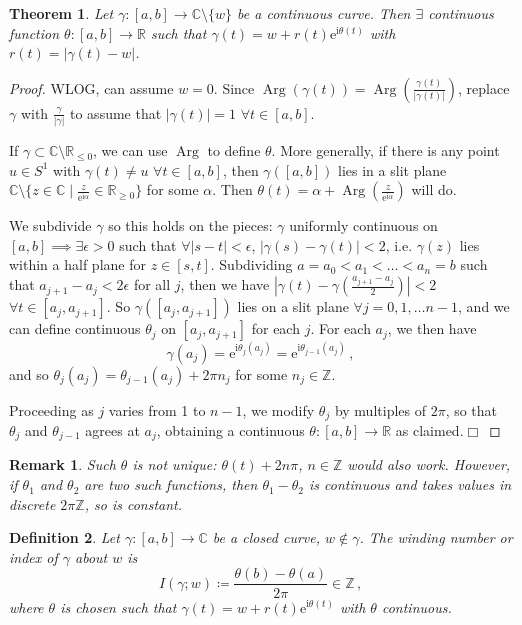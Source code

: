 \documentclass{article}
\theoremstyle{plain}\theoremheaderfont{\normalfont\itshape}\theorembodyfont{\rmfamily}\theoremseparator{.}\newtheorem*{rem}{Remark}\newtheorem*{ex}{Example}\newtheorem*{proof}{Proof}\newtheorem*{altp}{Alternative proof}\newtheorem*{con}{Consequences}\newtheorem*{notn}{Notations}\newtheorem*{cau}{Caution}\newtheorem*{term}{Terminology}\newtheorem*{keyex}{Key example}
\theoremstyle{plain}\theoremheaderfont{\normalfont\bfseries}\theorembodyfont{\rmfamily}\theoremseparator{.}\newtheorem{thm}{Theorem}[section]\newtheorem{lem}[thm]{Lemma}\newtheorem{prop}[thm]{Proposition}\newtheorem*{cor}{Corollary}\newtheorem{defn}[thm]{Definition}\newtheorem{clm}[thm]{Claim}\newtheorem{clminproof}{Claim}\newtheorem{leminproof}{Lemma}\newtheorem{app}{Application}
\theoremstyle{break}\theoremheaderfont{\normalfont\itshape}\theorembodyfont{\rmfamily}\theoremseparator{.\medskip}\newtheorem*{proofskip}{Proof}\newtheorem*{exs}{Examples}\newtheorem*{rems}{Remarks}\newtheorem*{rec}{Recall}\newtheorem*{ppts}{Properties}
\theoremstyle{break}\theoremheaderfont{\normalfont\bfseries}\theorembodyfont{\rmfamily}\theoremseparator{.\medskip}\newtheorem{lemskip}[thm]{Lemma}\newtheorem{defnskip}[thm]{Definition}\newtheorem{propskip}[thm]{Proposition}\newtheorem{thmskip}[thm]{Theorem}
\numberwithin{equation}{section}
\newcommand{\ii}{\mathrm{i}}
\newcommand{\ee}{\mathrm{e}}
\DeclareMathOperator*{\Arg}{Arg}
\newcommand{\qed}{\hfill\ensuremath{\Box}}
\newcommand{\abs}[1]{\left|#1\right|}
\newcommand{\ZZ}{\mathbb{Z}}
\newcommand{\RR}{\mathbb{R}}
\newcommand{\CC}{\mathbb{C}}
\begin{document}
    \begin{thm}
        Let \(\gamma:[a,b]\to\CC\setminus\{w\}\) be a continuous curve. Then \(\exists\) continuous function \(\theta:[a,b]\to\RR\) such that \(\gamma(t)=w+r(t)\ee^{\ii \theta(t)}\) with \(r(t)=\abs{\gamma(t)-w}\).
    \end{thm}
    \begin{proof}
        WLOG, can assume \(w=0\). Since \(\Arg(\gamma(t))=\Arg(\frac{\gamma(t)}{\abs{\gamma(t)}})\), replace \(\gamma\) with \(\frac{\gamma}{\abs{\gamma}}\) to assume that \(\abs{\gamma(t)}=1\) \(\forall t\in[a,b]\).

        If \(\gamma\subset\CC\setminus\RR_{\le 0}\), we can use \(\Arg\) to define \(\theta\). More generally, if there is any point \(u\in S^1\) with \(\gamma(t)\ne u\) \(\forall t\in[a,b]\), then \(\gamma([a,b])\) lies in a slit plane \(\CC\setminus\{z\in\CC\mid\frac{z}{\ee^{\ii \alpha}}\in\RR_{\ge 0}\}\) for some \(\alpha\). Then \(\theta(t)=\alpha+\Arg(\frac{z}{\ee^{\ii \alpha}})\) will do.

        We subdivide \(\gamma\) so this holds on the pieces: \(\gamma\) uniformly continuous on \([a,b]\implies\exists\epsilon>0\) such that \(\forall\abs{s-t}<\epsilon\), \(\abs{\gamma(s)-\gamma(t)}<2\), i.e. \(\gamma(z)\) lies within a half plane for \(z\in[s,t]\). Subdividing \(a=a_0<a_1<\dots<a_n=b\) such that \(a_{j+1}-a_j<2\epsilon\) for all \(j\), then we have \(\abs{\gamma(t)-\gamma(\frac{a_{j+1}-a_j}{2})}<2\) \(\forall t\in[a_j,a_{j+1}]\). So \(\gamma([a_j,a_{j+1}])\) lies on a slit plane \(\forall j=0,1,\dots n-1\), and we can define continuous \(\theta_j\) on \([a_j,a_{j+1}]\) for each \(j\). For each \(a_j\), we then have
        \[\gamma(a_j)=\ee^{\ii \theta_j(a_j)}=\ee^{\ii \theta_{j-1}(a_j)}\,,\]
        and so \(\theta_j(a_j)=\theta_{j-1}(a_j)+2\pi n_j\) for some \(n_j\in\ZZ\).

        Proceeding as \(j\) varies from 1 to \(n-1\), we modify \(\theta_j\) by multiples of \(2\pi\), so that \(\theta_j\) and \(\theta_{j-1}\) agrees at \(a_j\), obtaining a continuous \(\theta:[a,b]\to\RR\) as claimed.\qed
    \end{proof}
    \begin{rem}
        Such \(\theta\) is not unique: \(\theta(t)+2n\pi\), \(n\in\ZZ\) would also work. However, if \(\theta_1\) and \(\theta_2\) are two such functions, then \(\theta_1-\theta_2\) is continuous and takes values in discrete \(2\pi\ZZ\), so is constant.
    \end{rem}
    \begin{defn}
        Let \(\gamma:[a,b]\to\CC\) be a closed curve, \(w\notin\gamma\). The \textit{winding number} or \textit{index} of \(\gamma\) about \(w\) is
        \[I(\gamma;w)\coloneqq\frac{\theta(b)-\theta(a)}{2\pi}\in\ZZ\,,\]
        where \(\theta\) is chosen such that \(\gamma(t)=w+r(t)\ee^{\ii \theta(t)}\) with \(\theta\) continuous.
    \end{defn}
\end{document}
